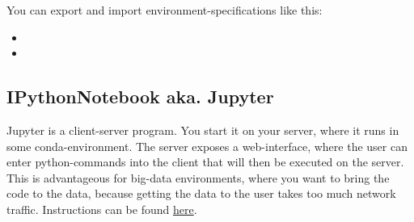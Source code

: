 You can export and import environment-specifications like this: 
\begin{itemize}
	\item {}
	\item {}
\end{itemize}


\subsection{IPythonNotebook aka. Jupyter}
Jupyter is a client-server program. You start it on your server, where it runs in some conda-environment. 
The server exposes a web-interface, where the user can enter python-commands into the client that will then be executed on the server. 
This is advantageous for big-data environments, where you want to bring the code to the data, because getting the data to the user takes too much network traffic. 
Instructions can be found \href{https://jupyter-notebook.readthedocs.io/en/stable/public_server.html}{here}.
